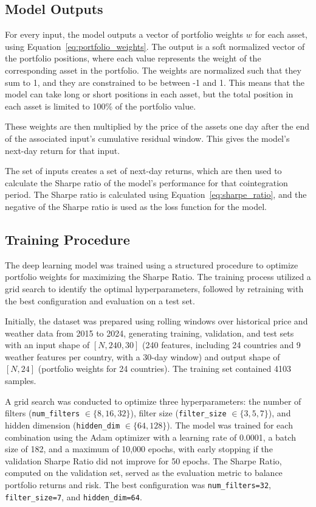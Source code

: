 \documentclass[12pt]{article}
\begin{document}
\subsection*{Model Outputs}

For every input, the model outputs a vector of portfolio weights $w$ for each asset, using Equation~\ref{eq:portfolio_weights}. The output is a soft normalized vector of the portfolio positions, where each value represents the weight of the corresponding asset in the portfolio. The weights are normalized such that they sum to 1, and they are constrained to be between -1 and 1. This means that the model can take long or short positions in each asset, but the total position in each asset is limited to 100\% of the portfolio value. 

These weights are then multiplied by the price of the assets one day after the end of the associated input's cumulative residual window. This gives the model's next-day return for that input.

The set of inputs creates a set of next-day returns, which are then used to calculate the Sharpe ratio of the model's performance for that cointegration period. The Sharpe ratio is calculated using Equation~\ref{eq:sharpe_ratio}, and the negative of the Sharpe ratio is used as the loss function for the model.

\subsection*{Training Procedure}

The deep learning model was trained using a structured procedure to optimize portfolio weights for maximizing the Sharpe Ratio. The training process utilized a grid search to identify the optimal hyperparameters, followed by retraining with the best configuration and evaluation on a test set.

Initially, the dataset was prepared using rolling windows over historical price and weather data from 2015 to 2024, generating training, validation, and test sets with an input shape of $[N, 240, 30]$ (240 features, including 24 countries and 9 weather features per country, with a 30-day window) and output shape of $[N, 24]$ (portfolio weights for 24 countries). The training set contained 4103 samples.

A grid search was conducted to optimize three hyperparameters: the number of filters (\texttt{num\_filters} $\in \{8, 16, 32\}$), filter size (\texttt{filter\_size} $\in \{3, 5, 7\}$), and hidden dimension (\texttt{hidden\_dim} $\in \{64, 128\}$). The model was trained for each combination using the Adam optimizer with a learning rate of 0.0001, a batch size of 182, and a maximum of 10,000 epochs, with early stopping if the validation Sharpe Ratio did not improve for 50 epochs. The Sharpe Ratio, computed on the validation set, served as the evaluation metric to balance portfolio returns and risk. The best configuration was \texttt{num\_filters=32}, \texttt{filter\_size=7}, and \texttt{hidden\_dim=64}.
\end{document}
